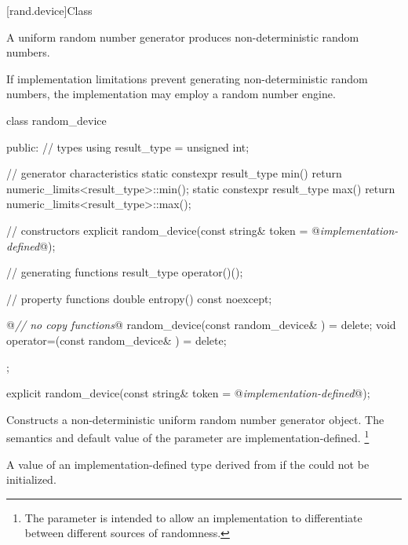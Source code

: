 

[rand.device]{Class }%

\pnum
A 
uniform random number generator
produces non-deterministic random numbers.

\pnum
If implementation limitations%
prevent generating non-deterministic random numbers,
the implementation may employ a random number engine.

\begin{codeblock}
class random_device
{
public:
 // types
 using result_type = unsigned int;

 // generator characteristics
 static constexpr result_type min() { return numeric_limits<result_type>::min(); }
 static constexpr result_type max() { return numeric_limits<result_type>::max(); }

 // constructors
 explicit random_device(const string& token = @\textit{implementation-defined}@);

 // generating functions
 result_type operator()();

 // property functions
 double entropy() const noexcept;

 @\textit{// no copy functions}@
 random_device(const random_device& ) = delete;
 void operator=(const random_device& ) = delete;
};
\end{codeblock}


%
\begin{itemdecl}
explicit random_device(const string& token = @\textit{implementation-defined}@);
\end{itemdecl}

\begin{itemdescr}
\pnum\effects Constructs a 
 non-deterministic uniform random number generator object.
 The semantics and default value of the 
 parameter are implementation-defined.
 \footnote{The parameter is intended
   to allow an implementation to differentiate
   between different sources of randomness.
 }

\pnum
\throws A value of an implementation-defined type
 derived from 
 if the  could not be initialized.
\end{itemdescr}

